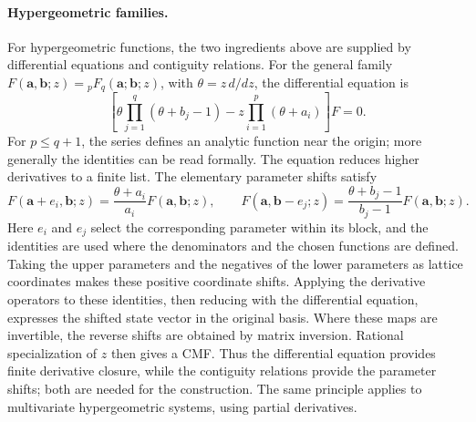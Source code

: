 \documentclass[oneside,english,11pt]{amsart}
\begin{document}
\paragraph{Hypergeometric families.}
For hypergeometric functions, the two ingredients above are supplied
by differential equations and contiguity relations.  For the general
family $F(\mathbf a,\mathbf b;z)={}_pF_q(\mathbf a;\mathbf b;z)$,
with $\theta=z\,d/dz$, the differential equation is
\cite[Section~16.8]{NIST:DLMF}
\[
 \left[\theta\prod_{j=1}^q(\theta+b_j-1)
       -z\prod_{i=1}^p(\theta+a_i)\right]F=0.
\]
For $p\le q+1$, the series defines an analytic function near the
origin; more generally the identities can be read formally.
The equation reduces higher derivatives to a finite list.  The elementary
parameter shifts satisfy
\[
 F(\mathbf a+e_i,\mathbf b;z)
   =\frac{\theta+a_i}{a_i}F(\mathbf a,\mathbf b;z),\qquad
 F(\mathbf a,\mathbf b-e_j;z)
   =\frac{\theta+b_j-1}{b_j-1}F(\mathbf a,\mathbf b;z).
\]
Here $e_i$ and $e_j$ select the corresponding parameter within its
block, and the identities are used where the denominators and the
chosen functions are defined.  Taking the upper parameters and the
negatives of the lower parameters as lattice coordinates makes these
positive coordinate shifts.  Applying the derivative operators to
these identities, then reducing with the differential equation,
expresses the shifted state vector in the original basis.
Where these maps are invertible, the reverse shifts are obtained by
matrix inversion.  Rational specialization of $z$ then gives a CMF.
Thus the differential equation provides finite derivative closure,
while the contiguity relations provide the parameter shifts; both
are needed for the construction.  The same principle applies to
multivariate hypergeometric systems, using partial derivatives.
\end{document}
